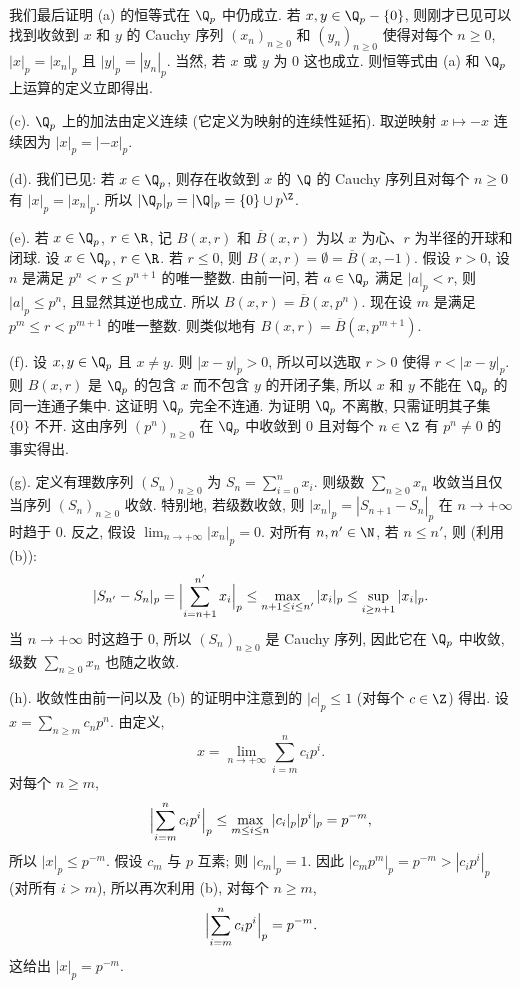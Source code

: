 \begin{solution}
我们最后证明 (a) 的恒等式在 $\Q_p$ 中仍成立. 若 $x, y \in \Q_p - \{0\}$, 则刚才已见可以找到收敛到 $x$ 和 $y$ 的 Cauchy 序列 $(x_n)_{n \geq 0}$ 和 $(y_n)_{n \geq 0}$ 使得对每个 $n \geq 0$, $|x|_p = |x_n|_p$ 且 $|y|_p = |y_n|_p$. 当然, 若 $x$ 或 $y$ 为 $0$ 这也成立. 则恒等式由 (a) 和 $\Q_p$ 上运算的定义立即得出.

(c). $\Q_p$ 上的加法由定义连续 (它定义为映射的连续性延拓). 取逆映射 $x \longmapsto -x$ 连续因为 $|x|_p = |-x|_p$.

(d). 我们已见: 若 $x \in \Q_p$, 则存在收敛到 $x$ 的 $\Q$ 的 Cauchy 序列且对每个 $n \geq 0$ 有 $|x|_p = |x_n|_p$. 所以 $|\Q_p|_p = |\Q|_p = \{0\} \cup p^{\Z}$.

(e). 若 $x \in \Q_p$, $r \in \R$, 记 $B(x, r)$ 和 $\overline{B}(x, r)$ 为以 $x$ 为心、$r$ 为半径的开球和闭球.
设 $x \in \Q_p$, $r \in \R$. 若 $r \leq 0$, 则 $B(x, r) = \emptyset = \overline{B}(x, -1)$. 假设 $r > 0$, 设 $n$ 是满足 $p^n < r \leq p^{n+1}$ 的唯一整数. 由前一问, 若 $a \in \Q_p$ 满足 $|a|_p < r$, 则 $|a|_p \leq p^n$, 且显然其逆也成立. 所以 $B(x, r) = \overline{B}(x, p^n)$. 现在设 $m$ 是满足 $p^m \leq r < p^{m+1}$ 的唯一整数. 则类似地有 $B(x, r) = \overline{B}(x, p^{m+1})$.

(f). 设 $x, y \in \Q_p$ 且 $x \neq y$. 则 $|x - y|_p > 0$, 所以可以选取 $r > 0$ 使得 $r < |x - y|_p$. 则 $B(x, r)$ 是 $\Q_p$ 的包含 $x$ 而不包含 $y$ 的开闭子集, 所以 $x$ 和 $y$ 不能在 $\Q_p$ 的同一连通子集中. 这证明 $\Q_p$ 完全不连通.
为证明 $\Q_p$ 不离散, 只需证明其子集 $\{0\}$ 不开. 这由序列 $(p^n)_{n \geq 0}$ 在 $\Q_p$ 中收敛到 $0$ 且对每个 $n \in \Z$ 有 $p^n \neq 0$ 的事实得出.

(g). 定义有理数序列 $(S_n)_{n \geq 0}$ 为 $S_n = \sum_{i=0}^n x_i$. 则级数 $\sum_{n \geq 0}x_n$ 收敛当且仅当序列 $(S_n)_{n \geq 0}$ 收敛. 特别地, 若级数收敛, 则 $|x_n|_p = |S_{n+1} - S_n|_p$ 在 $n \to +\infty$ 时趋于 $0$.
反之, 假设 $\lim_{n \to +\infty}|x_n|_p = 0$. 对所有 $n, n' \in \N$, 若 $n \leq n'$, 则 (利用 (b)):
\[
|S_{n'} - S_n|_p = \Bigl|\sum_{i=n+1}^{n'}x_i\Bigr|_p \leq \max_{n+1 \leq i \leq n'}|x_i|_p \leq \sup_{i \geq n+1}|x_i|_p.
\]
当 $n \to +\infty$ 时这趋于 $0$, 所以 $(S_n)_{n \geq 0}$ 是 Cauchy 序列, 因此它在 $\Q_p$ 中收敛, 级数 $\sum_{n \geq 0}x_n$ 也随之收敛.

(h). 收敛性由前一问以及 (b) 的证明中注意到的 $|c|_p \leq 1$ (对每个 $c \in \Z$) 得出. 设 $x = \sum_{n \geq m}c_np^n$. 由定义,
\[
x = \lim_{n \to +\infty}\sum_{i=m}^n c_ip^i.
\]
对每个 $n \geq m$,
\[
\Bigl|\sum_{i=m}^n c_ip^i\Bigr|_p \leq \max_{m \leq i \leq n}|c_i|_p|p^i|_p = p^{-m},
\]
所以 $|x|_p \leq p^{-m}$. 假设 $c_m$ 与 $p$ 互素; 则 $|c_m|_p = 1$. 因此 $|c_mp^m|_p = p^{-m} > |c_ip^i|_p$ (对所有 $i > m$), 所以再次利用 (b), 对每个 $n \geq m$,
\[
\Bigl|\sum_{i=m}^n c_ip^i\Bigr|_p = p^{-m}.
\]
这给出 $|x|_p = p^{-m}$.


\end{solution}
